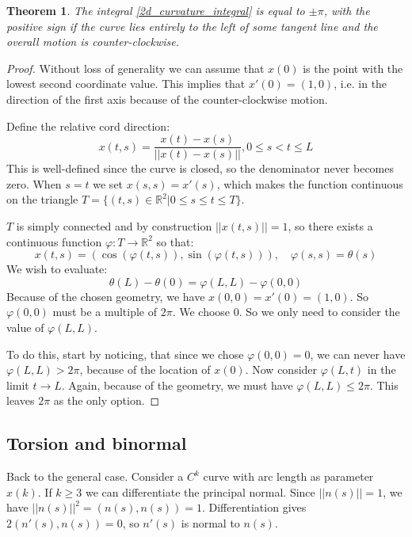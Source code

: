 \documentclass[12pt, a4paper]{article}
\newtheorem{theorem}{Theorem}[section]
\numberwithin{equation}{section}
\begin{document}
\begin{theorem}
The integral \ref{2d_curvature_integral} is equal to $\pm \pi$, with the positive sign if the curve lies entirely to the left of some tangent line and the overall motion is counter-clockwise.
\end{theorem}
\begin{proof}
Without loss of generality we can assume that $x(0)$ is the point with the lowest second coordinate value. This implies that $x'(0)=(1,0)$, i.e. in the direction of the first axis because of the counter-clockwise motion.

Define the relative cord direction:
\begin{equation}
x(t,s)=\frac{x(t)-x(s)}{||x(t)-x(s)||}, 0\le s<t\le L
\end{equation}
This is well-defined since the curve is closed, so the denominator never becomes zero. When $s=t$ we set $x(s,s)=x'(s)$, which makes the function continuous on the triangle $T=\{(t,s)\in\mathbb{R}^2|0\le s\le t\le T\}$.

$T$ is simply connected and by construction $||x(t,s)||=1$, so there exists a continuous function $\varphi: T\rightarrow\mathbb{R}^2$ so that:
\begin{equation}
x(t,s)=(\cos(\varphi(t,s)),\sin(\varphi(t,s))),\quad\varphi(s,s)=\theta(s)
\end{equation}
We wish to evaluate:
\begin{equation}
\theta(L)-\theta(0)=\varphi(L,L)-\varphi(0,0)
\end{equation}
Because of the chosen geometry, we have $x(0, 0)=x'(0)=(1,0)$. So $\varphi(0,0)$ must be a multiple of $2\pi$. We choose 0. So we only need to consider the value of $\varphi(L,L)$.

To do this, start by noticing, that since we chose $\varphi(0,0)=0$, we can never have $\varphi(L,L)>2\pi$, because of the location of $x(0)$. Now consider $\varphi(L,t)$ in the limit $t\rightarrow L$. Again, because of the geometry, we must have $\varphi(L,L)\le 2\pi$. This leaves $2\pi$ as the only option.
\end{proof}

\subsection{Torsion and binormal}
Back to the general case. Consider a $C^k$ curve with arc length as parameter $x(k)$. If $k\ge 3$ we can differentiate the principal normal. Since $||n(s)||=1$, we have $||n(s)||^2=(n(s),n(s))=1$. Differentiation gives $2(n'(s),n(s))=0$, so $n'(s)$ is normal to $n(s)$.
\end{document}
